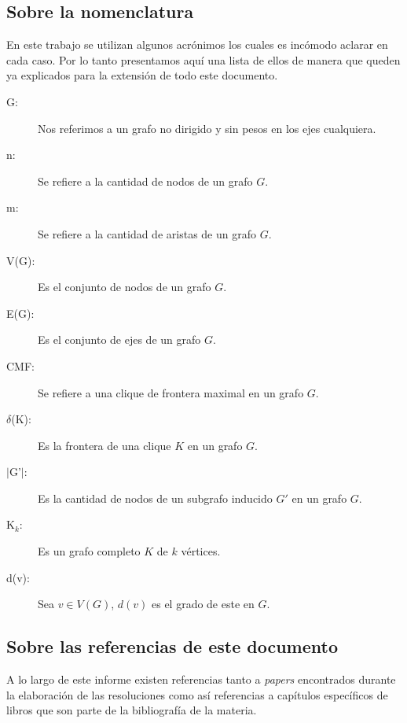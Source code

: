 \label{notas_preliminares}
{}
\subsection*{Sobre la nomenclatura}
\par En este trabajo se utilizan algunos acr\'onimos los cuales es inc\'omodo
    aclarar en cada caso. Por lo tanto presentamos aqu\'i una lista de ellos
    de manera que queden ya explicados para la extensi\'on de todo este
    documento.

\begin{description}
    \item[G: ] Nos referimos a un grafo no dirigido y sin pesos en los ejes
        cualquiera.

    \item[n: ] Se refiere a la cantidad de nodos de un grafo $G$.

    \item[m: ] Se refiere a la cantidad de aristas de un grafo $G$.

    \item[V(G): ] Es el conjunto de nodos de un grafo $G$.

    \item[E(G): ] Es el conjunto de ejes de un grafo $G$.

    \item[CMF: ] Se refiere a una clique de frontera maximal en un grafo $G$.

    \item[$\delta$(K): ] Es la frontera de una clique $K$ en un grafo $G$.

    \item[$|$G'$|$: ] Es la cantidad de nodos de un subgrafo inducido $G'$ en un grafo $G$.

    \item[K$_k$: ] Es un grafo completo $K$ de $k$ v\'ertices.

    \item[d(v): ] Sea $v \in V(G)$, $d(v)$ es el grado de este en $G$.
\end{description}

{}
\subsection*{Sobre las referencias de este documento}
\par A lo largo de este informe existen referencias tanto a \emph{papers}
    encontrados durante la elaboraci\'on de las resoluciones como as\'i
    referencias a cap\'itulos espec\'ificos de libros que son parte de la
    bibliograf\'ia de la materia.

